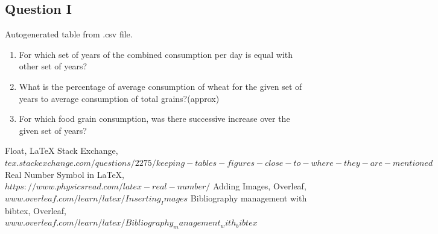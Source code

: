 \documentclass[a4paper]{article}
\begin{document}
\subsection*{Question I}
\begin{table}[h]
  \begin{center}
    \caption{Autogenerated table from .csv file.}
    \label{table1}
  \end{center}
\end{table}
\begin{enumerate}
\item For which set of years of the combined consumption per day is equal with other set of years?
\item What is the percentage of average consumption of wheat for the given set of years to average consumption of total grains?(approx)
\item For which food grain consumption, was there successive increase over the given set of years?
\end{enumerate}
\pagebreak
\begin{thebibliography} {}
 Float, LaTeX Stack Exchange, $tex.stackexchange.com/questions/2275/keeping-tables-figures-close-to-where-they-are-mentioned$ 
 Real Number Symbol in LaTeX, $https://www.physicsread.com/latex-real-number/$
Adding Images, Overleaf, $www.overleaf.com/learn/latex/Inserting_Images$
Bibliography management with bibtex, Overleaf, $www.overleaf.com/learn/latex/Bibliography_management_with_bibtex$

\end{thebibliography} 
\end{document}
